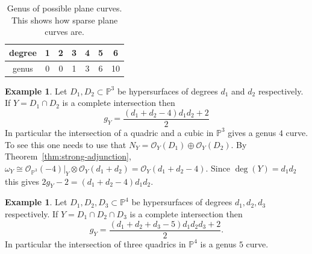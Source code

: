 \documentclass[12pt]{article}
\numberwithin{equation}{section}
\theoremstyle{definition}
\newtheorem{example}[theorem]{Example}
\theoremstyle{remark}
\newcommand{\Ocal}{\mathcal{O}}
\newcommand{\PP}{\mathbb{P}}
\begin{document}
\begin{table}
	\begin{center}
\begin{tabular}{|c||c|c|c|c|c|c|}
\hline  degree & 1 & 2 & 3 & 4 & 5 & 6 \\ \hline
	genus  & 0 & 0 & 1 & 3 & 6 & 10 \\ \hline
\end{tabular}
\end{center}
\caption{Genus of possible plane curves. 
This shows how sparse plane curves are.}\label{tab:plane-curves}
\end{table}

\begin{example}
	Let $D_1,D_2 \subset \PP^3$ be hypersurfaces of degrees $d_1$ and $d_2$ respectively. 
	If $Y=D_1\cap D_2$ is a complete intersection then 
	$$g_Y = \frac{(d_1+d_2-4)d_1d_2+2}{2}$$
	In particular the intersection of a quadric and a cubic in $\PP^3$ gives a genus $4$ curve. 
	To see this one needs to use that $N_Y = \Ocal_Y(D_1)\oplus \Ocal_Y(D_2)$. 
	By Theorem~\ref{thm:strong-adjunction}, $\omega_Y \cong \Ocal_{\PP^3}(-4)\vert_Y\otimes \Ocal_Y(d_1+d_2) = \Ocal_Y(d_1+d_2-4)$. Since $\deg(Y)=d_1d_2$ this gives $2g_Y-2 = (d_1+d_2-4)d_1d_2$.
\end{example}

\begin{example}
	Let $D_1,D_2,D_3 \subset \PP^4$ be hypersurfaces of degrees $d_1,d_2,d_3$ respectively. 
	If $Y=D_1\cap D_2 \cap D_3$ is a complete intersection then 
	 $$ g_Y = \frac{(d_1+d_2+d_3-5)d_1d_2d_3+2}{2}.$$
	In particular the intersection of three quadrics in $\PP^4$ is a genus $5$ curve.
\end{example}
\end{document}
